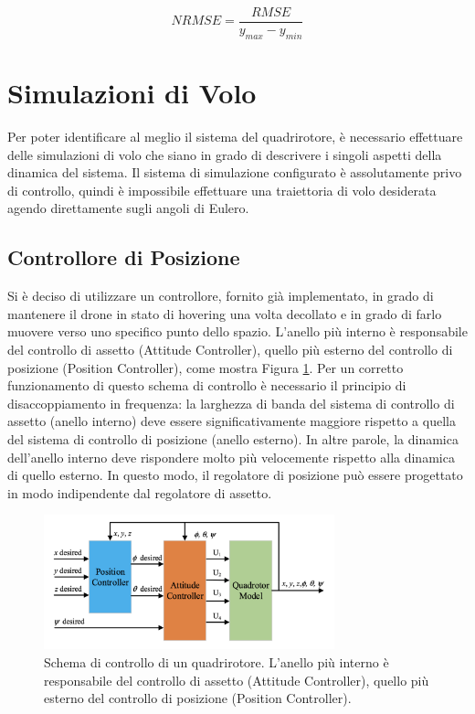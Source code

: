 \begin{equation}
	NRMSE = \frac{RMSE}{y_{max} - y_{min}}
	\label{nrmse}
\end{equation}


\section{Simulazioni di Volo}
Per poter identificare al meglio il sistema del quadrirotore, è necessario effettuare delle simulazioni di volo che siano in grado di descrivere i singoli aspetti della dinamica del sistema. Il sistema di simulazione configurato è assolutamente privo di controllo, quindi è impossibile effettuare una traiettoria di volo desiderata agendo direttamente sugli angoli di Eulero.\\

\subsection{Controllore di Posizione}
Si è deciso di utilizzare un controllore, fornito già implementato, in grado di mantenere il drone in stato di hovering una volta decollato e in grado di farlo muovere verso uno specifico punto dello spazio. L'anello più interno è responsabile del controllo di assetto (Attitude Controller), quello più esterno del controllo di posizione (Position Controller), come mostra Figura \ref{fig:quadControlSystem}. Per un corretto funzionamento di questo schema di controllo è necessario il principio di disaccoppiamento in frequenza: la larghezza di banda del sistema di controllo di assetto (anello interno) deve essere significativamente maggiore rispetto a quella del sistema di controllo di posizione (anello esterno). In altre parole, la dinamica dell’anello interno deve rispondere molto più velocemente rispetto alla dinamica di quello esterno. In questo modo, il regolatore di posizione può essere progettato in modo indipendente dal regolatore di assetto.

\begin{figure}[H]
	\centering
	\includegraphics[width=0.75\textwidth]{gfx/quadControlSystem}
	\caption[Schema di controllo di un quadrirotore.]{Schema di controllo di un quadrirotore. L'anello più interno è responsabile del controllo di assetto (Attitude Controller), quello più esterno del controllo di posizione (Position Controller).}
	\label{fig:quadControlSystem}
\end{figure}

